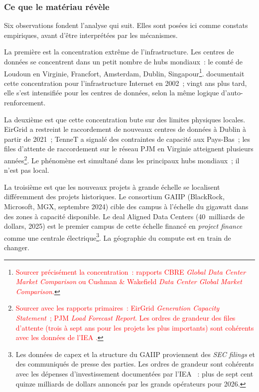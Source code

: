 \subsubsection{Ce que le matériau révèle}

Six observations fondent l'analyse qui suit. Elles sont posées ici comme constats empiriques, avant d'être interprétées par les mécanismes.

La première est la concentration extrême de l'infrastructure. Les centres de données se concentrent dans un petit nombre de hubs mondiaux~: le comté de Loudoun en Virginie, Francfort, Amsterdam, Dublin, Singapour\footnote{\textcolor{red}{Sourcer précisément la concentration~: rapports CBRE \emph{Global Data Center Market Comparison} ou Cushman \& Wakefield \emph{Data Center Global Market Comparison}.}}. \textcite{malecki_economic_2002} documentait cette concentration pour l'infrastructure Internet en 2002~; vingt ans plus tard, elle s'est intensifiée pour les centres de données, selon la même logique d'auto-renforcement.

La deuxième est que cette concentration bute sur des limites physiques locales. EirGrid a restreint le raccordement de nouveaux centres de données à Dublin à partir de 2021~; TenneT a signalé des contraintes de capacité aux Pays-Bas~; les files d'attente de raccordement sur le réseau PJM en Virginie atteignent plusieurs années\footnote{\textcolor{red}{Sourcer avec les rapports primaires~: EirGrid \emph{Generation Capacity Statement}~; PJM \emph{Load Forecast Report}. Les ordres de grandeur des files d'attente (trois à sept ans pour les projets les plus importants) sont cohérents avec les données de l'IEA \parencite{iea_energy_ai_2025}.}}. Le phénomène est simultané dans les principaux hubs mondiaux~; il n'est pas local.

La troisième est que les nouveaux projets à grande échelle se localisent différemment des projets historiques. Le consortium GAIIP (BlackRock, Microsoft, MGX, septembre 2024) cible des campus à l'échelle du gigawatt dans des zones à capacité disponible. Le deal Aligned Data Centers (40~milliards de dollars, 2025) est le premier campus de cette échelle financé en \emph{project finance} comme une centrale électrique\footnote{Les données de capex et la structure du GAIIP proviennent des \emph{SEC filings} et des communiqués de presse des parties. Les ordres de grandeur sont cohérents avec les dépenses d'investissement documentées par l'IEA \parencite{iea_energy_ai_2025}~: plus de sept cent quinze milliards de dollars annoncés par les grands opérateurs pour 2026.}. La géographie du compute est en train de changer.

